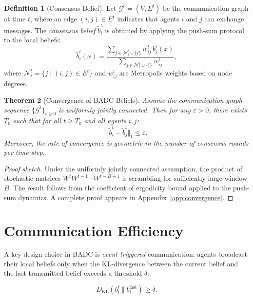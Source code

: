 \documentclass[12pt,oneside]{report}
\newtheorem{theorem}{Theorem}[chapter]
\theoremstyle{definition}
\newtheorem{definition}[theorem]{Definition}
\theoremstyle{remark}
\begin{document}
\begin{definition}[Consensus Belief]
  Let $\mathcal{G}^t = (V, E^t)$ be the communication graph at time $t$, where
  an edge $(i, j) \in E^t$ indicates that agents $i$ and $j$ can exchange messages.
  The \emph{consensus belief} $\tilde{b}_i^t$ is obtained by applying the push-sum
  protocol to the local beliefs:
  \begin{equation}
    \tilde{b}_i^{t}(x) = \frac{\sum_{j \in \mathcal{N}_i^t \cup \{i\}} w_{ij}^t \, b_j^t(x)}
                               {\sum_{j \in \mathcal{N}_i^t \cup \{i\}} w_{ij}^t},
  \end{equation}
  where $\mathcal{N}_i^t = \{j \mid (i, j) \in E^t\}$ and $w_{ij}^t$ are
  Metropolis weights based on node degrees.
\end{definition}

\begin{theorem}[Convergence of BADC Beliefs]
  \label{thm:convergence}
  Assume the communication graph sequence $\{\mathcal{G}^t\}_{t \geq 0}$ is
  uniformly jointly connected. Then for any $\varepsilon > 0$, there exists
  $T_0$ such that for all $t \geq T_0$ and all agents $i, j$:
  \begin{equation}
    \Vert \tilde{b}_i^t - \tilde{b}_j^t \Vert_1 \leq \varepsilon.
  \end{equation}
  Moreover, the rate of convergence is geometric in the number of consensus rounds
  per time step.
\end{theorem}

\begin{proof}[Proof sketch]
  Under the uniformly jointly connected assumption, the product of stochastic
  matrices $W^t W^{t-1} \cdots W^{t-B+1}$ is scrambling for sufficiently large
  window $B$. The result follows from the coefficient of ergodicity bound
  \citep{seneta2006nonnegative} applied to the push-sum dynamics. A complete
  proof appears in Appendix~\ref{app:convergence}.
\end{proof}

\section{Communication Efficiency}

A key design choice in BADC is \emph{event-triggered} communication: agents
broadcast their local beliefs only when the KL-divergence between the current
belief and the last transmitted belief exceeds a threshold $\delta$:

\begin{equation}
  D_{\mathrm{KL}}(b_i^t \;\Vert\; b_i^{\text{last}}) \geq \delta.
  \label{eq:trigger}
\end{equation}
\end{document}
